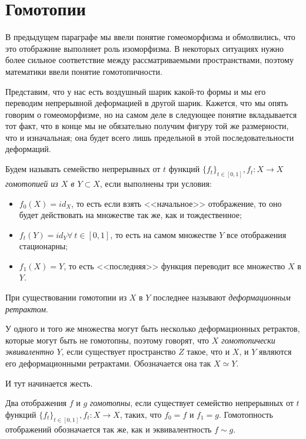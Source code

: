 \section{Гомотопии}


	В предыдущем параграфе мы ввели понятие гомеоморфизма и обмолвились, что это отображние выполняет роль изоморфизма. В некоторых ситуациях нужно более сильное соответствие между рассматриваемыми пространствами, поэтому математики ввели понятие гомотопичности.
	
	Представим, что у нас есть воздушный шарик какой-то формы и мы его переводим непрерывной деформацией в другой шарик. Кажется, что мы опять говорим о гомеоморфизме, но на самом деле в следующее понятие вкладывается тот факт, что в конце мы не обязательно получим фигуру той же размерности, что и изначальная; она будет всего лишь предельной в этой последовательности деформаций.
	
\begin{definition}
	Будем называть семейство непрерывных от $t$ функций $\lbrace f_t \rbrace_{t \in [0, 1]}, f_t \colon X \to X$ \emph{гомотопией из $X$ в $Y \subset X$}, если выполнены три условия:
	\begin{itemize}
		\item $f_0 (X) = id_X$, то есть если взять <<начальное>> отображение, то оно будет действовать на множестве так же, как и тождественное;
		\item $f_t(Y) = id_Y \forall \!\ t \in [0, 1]$, то есть на самом множестве $Y$ все отображения стационарны;
		\item $f_1(X) = Y$, то есть <<последняя>> функция переводит все множество $X$ в $Y$.
	\end{itemize}
	При существовании гомотопии из $X$ в $Y$ последнее называют \emph{деформационным ретрактом}.
\end{definition}

	У одного и того же множества могут быть несколько деформационных ретрактов, которые могут быть не гомотопны, поэтому говорят, что \emph{$X$ гомотопически эквивалентно $Y$}, если существует пространство $Z$ такое, что и $X$, и $Y$ являются его деформационными ретрактами. Обозначается она так $X \simeq Y$.
	
	И тут начинается жесть.
	
\begin{definition}
	Два отображения $f$ и $g$ \emph{гомотопны}, если существует семейство непрерывных от $t$ функций $\lbrace f_t \rbrace_{t \in [0, 1]}, f_t \colon X \to X$, таких, что $f_0 = f$ и $f_1 = g$. Гомотопность отображений обозначается так же, как и эквивалентность $f \sim g$.
\end{definition}

